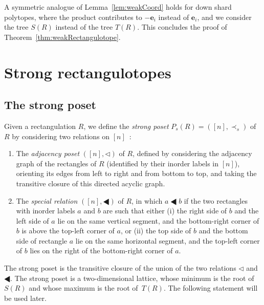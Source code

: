 \documentclass{amsart}
\theoremstyle{definition}
\renewcommand{\b}[1]{{\boldsymbol{#1}}} %
\newcommand{\darkblue}{\color{darkblue}} %
\newcommand{\defn}[1]{\textsl{\darkblue #1}} %
\newcommand{\tri}{\lhd}
\newcommand{\btri}{\LHD}
\begin{document}
A symmetric analogue of Lemma~\ref{lem:weakCoord} holds for down shard polytopes, where the product contributes to $-\b{e}_i$ instead of $\b{e}_i$, and we consider the tree $S(R)$ instead of the tree $T(R)$.
This concludes the proof of Theorem~\ref{thm:weakRectangulotope}.


\section{Strong rectangulotopes}
\label{sec:strongRectangulotopes}

\subsection{The strong poset}
\label{subsec:strongPoset}

Given a rectangulation $R$, we define the \defn{strong poset} $P_s(R)=([n],\prec_s)$ of $R$ by considering two relations on $[n]$~\cite{ACFF24}:
\begin{enumerate}
\item The \defn{adjacency poset} $([n],\tri)$ of $R$, defined by considering the adjacency graph of the rectangles of $R$ (identified by their inorder labels in $[n]$), orienting its edges from left to right and from bottom to top, and taking the transitive closure of this directed acyclic graph.
\item The \defn{special relation} $([n],\btri)$ of $R$, in which $a\btri b$ if the two rectangles with inorder labels $a$ and $b$ are such that either (i) the right side of $b$ and the left side of $a$ lie on the same vertical segment, and the bottom-right corner of $b$ is above the top-left corner of $a$, or (ii) the top side of $b$ and the bottom side of rectangle $a$ lie on the same horizontal segment, and the top-left corner of $b$ lies on the right of the bottom-right corner of  $a$.
\end{enumerate}
The strong poset is the transitive closure of the union of the two relations $\tri$ and $\btri$. 
The strong poset is a two-dimensional lattice, whose minimum is the root of~$S(R)$ and whose maximum is the root of~$T(R)$. The following statement will be used later.
\end{document}
